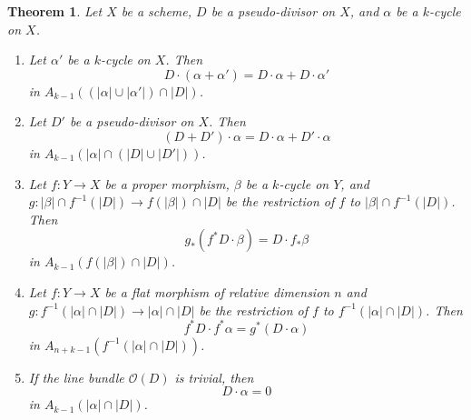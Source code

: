 \documentclass[leqno, openany]{memoir}
\newtheorem{thm}{Theorem}[section]
\theoremstyle{definition}
\theoremstyle{remark}
\theoremstyle{plain}
\theoremstyle{definition}
\theoremstyle{remark}
\newcommand{\mc}[1]{\mathcal{#1}}
\begin{document}
\begin{thm} \label{properties}
Let $X$ be a scheme, $D$ be a pseudo-divisor on $X$, and $\alpha$ be a $k$-cycle on $X$.
\begin{enumerate}[label=(\alph*)]
\item Let $\alpha'$ be a $k$-cycle on $X$. Then \[ D \cdot (\alpha + \alpha') = D \cdot \alpha + D \cdot \alpha' \] in $A_{k-1} ((|\alpha| \cup |\alpha'|) \cap |D|)$.
\item Let $D'$ be a pseudo-divisor on $X$. Then \[ (D + D') \cdot \alpha = D \cdot \alpha + D' \cdot \alpha \] in $A_{k-1}(|\alpha| \cap (|D| \cup |D'|))$.
\item Let $f\colon Y \to X$ be a proper morphism, $\beta$ be a $k$-cycle on $Y$, and $g\colon |\beta| \cap f^{-1}(|D|) \to f(|\beta|) \cap |D|$ be the restriction of $f$ to $|\beta| \cap f^{-1}(|D|)$. Then \[ g_* (f^* D \cdot \beta) = D \cdot f_* \beta \] in $A_{k-1}(f(|\beta|) \cap |D|)$.
\item Let $f\colon Y \to X$ be a flat morphism of relative dimension $n$ and $g\colon f^{-1}(|\alpha| \cap |D|) \to |\alpha| \cap |D|$ be the restriction of $f$ to $f^{-1}(|\alpha| \cap |D|)$. Then \[ f^* D \cdot f^* \alpha = g^* (D \cdot \alpha) \] in $A_{n+k-1}(f^{-1}(|\alpha| \cap |D|))$.
\item If the line bundle $\mc{O}(D)$ is trivial, then \[ D \cdot \alpha = 0 \] in $A_{k-1}(|\alpha| \cap |D|)$.
\end{enumerate}
\end{thm}
\end{document}
